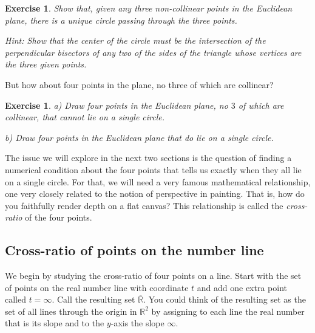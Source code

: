 \documentclass{article}%
\newtheorem{exercise}[theorem]{Exercise}
\begin{document}
\begin{exercise}
Show that, given any three non-collinear points in the Euclidean plane, there
is a unique circle passing through the three points.

Hint: Show that the center of the circle must be the intersection of the
perpendicular bisectors of any two of the sides of the triangle whose vertices
are the three given points.
\end{exercise}

But how about four points in the plane, no three of which are collinear?

\begin{exercise}
a) Draw four points in the Euclidean plane, no $3$ of which are collinear,
that cannot lie on a single circle.

b) Draw four points in the Euclidean plane that do lie on a single circle.
\end{exercise}

The issue we will explore in the next two sections is the question of finding
a numerical condition about the four points that tells us exactly when they
all lie on a single circle. For that, we will need a very famous mathematical
relationship, one very closely related to the notion of perspective in
painting. That is, how do you faithfully render depth on a flat canvas? This
relationship is called the \textit{cross-ratio} of the four points. \pagebreak

\subsection{Cross-ratio of points on the number line}

We begin by studying the cross-ratio of four points on a line. Start with the
set of points on the real number line with coordinate $t$ and add one extra
point called $t=\infty$. Call the resulting set $\overline{\mathbb{R}}$. You
could think of the resulting set as the set of all lines through the origin in
$\mathbb{R}^{2}$ by assigning to each line the real number that is its slope
and to the $y$-axis the slope $\infty$.
\end{document}
